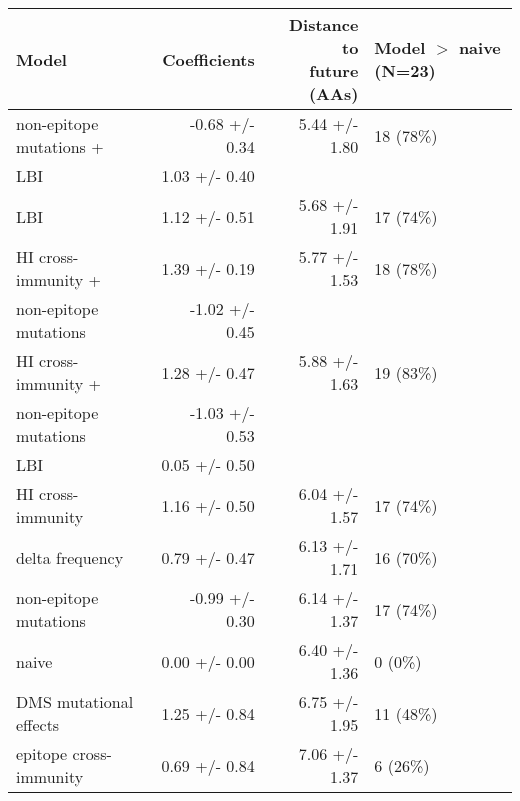 \begin{tabular*}{0.85\textwidth}{lrrl}
\toprule
                             Model &    Coefficients & \makecell{Distance to \\ future (AAs)} & \makecell[l]{Model $>$ naive \\ (N=23)} \\
\midrule
           non-epitope mutations + &  -0.68 +/- 0.34 &                          5.44 +/- 1.80 &                               18 (78\%) \\
                   \hspace{3mm}LBI &   1.03 +/- 0.40 &                                        &                                         \\
                               LBI &   1.12 +/- 0.51 &                          5.68 +/- 1.91 &                               17 (74\%) \\
               HI cross-immunity + &   1.39 +/- 0.19 &                          5.77 +/- 1.53 &                               18 (78\%) \\
 \hspace{3mm}non-epitope mutations &  -1.02 +/- 0.45 &                                        &                                         \\
               HI cross-immunity + &   1.28 +/- 0.47 &                          5.88 +/- 1.63 &                               19 (83\%) \\
 \hspace{3mm}non-epitope mutations &  -1.03 +/- 0.53 &                                        &                                         \\
                   \hspace{3mm}LBI &   0.05 +/- 0.50 &                                        &                                         \\
                 HI cross-immunity &   1.16 +/- 0.50 &                          6.04 +/- 1.57 &                               17 (74\%) \\
                   delta frequency &   0.79 +/- 0.47 &                          6.13 +/- 1.71 &                               16 (70\%) \\
             non-epitope mutations &  -0.99 +/- 0.30 &                          6.14 +/- 1.37 &                               17 (74\%) \\
                             naive &   0.00 +/- 0.00 &                          6.40 +/- 1.36 &                                 0 (0\%) \\
            DMS mutational effects &   1.25 +/- 0.84 &                          6.75 +/- 1.95 &                               11 (48\%) \\
            epitope cross-immunity &   0.69 +/- 0.84 &                          7.06 +/- 1.37 &                                6 (26\%) \\
\bottomrule
\end{tabular*}
